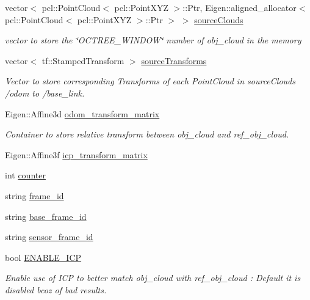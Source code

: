 \begin{DoxyCompactItemize}
vector$<$ pcl\+::\+Point\+Cloud$<$ pcl\+::\+Point\+X\+YZ $>$\+::Ptr, Eigen\+::aligned\+\_\+allocator$<$ pcl\+::\+Point\+Cloud$<$ pcl\+::\+Point\+X\+YZ $>$\+::Ptr $>$ $>$ \hyperlink{classdatmo_1_1cloud__segmentation_abcf359aaf4f17128e961473692d9c473}{source\+Clouds}
\begin{DoxyCompactList}\small\item\em vector to store the \char`\"{}\+O\+C\+T\+R\+E\+E\+\_\+\+W\+I\+N\+D\+O\+W\char`\"{} number of obj\+\_\+cloud in the memory \end{DoxyCompactList}\item 
vector$<$ tf\+::\+Stamped\+Transform $>$ \hyperlink{classdatmo_1_1cloud__segmentation_a24a81e37b2eff06482f65b09e39af9e4}{source\+Transforms}
\begin{DoxyCompactList}\small\item\em Vector to store corresponding Transforms of each Point\+Cloud in source\+Clouds /odom to /base\+\_\+link. \end{DoxyCompactList}\item 
Eigen\+::\+Affine3d \hyperlink{classdatmo_1_1cloud__segmentation_a9f47c2e7cba42121779e2772a052f58b}{odom\+\_\+transform\+\_\+matrix}
\begin{DoxyCompactList}\small\item\em Container to store relative transform between obj\+\_\+cloud and ref\+\_\+obj\+\_\+cloud. \end{DoxyCompactList}\item 
Eigen\+::\+Affine3f \hyperlink{classdatmo_1_1cloud__segmentation_ac7762960a72df80afdf8bedd59335ddc}{icp\+\_\+transform\+\_\+matrix}
\item 
int \hyperlink{classdatmo_1_1cloud__segmentation_a56499171fe846acfb2a73a5134261a91}{counter}
\item 
string \hyperlink{classdatmo_1_1cloud__segmentation_a16ce63fc6e22bab22c377d9049923119}{frame\+\_\+id}
\item 
string \hyperlink{classdatmo_1_1cloud__segmentation_a744619077c95172db4c19f45dcd9f30c}{base\+\_\+frame\+\_\+id}
\item 
string \hyperlink{classdatmo_1_1cloud__segmentation_a53785ef8494de0fd1efed824562f3368}{sensor\+\_\+frame\+\_\+id}
\item 
bool \hyperlink{classdatmo_1_1cloud__segmentation_a71c4d63aacea33f4c1b172e1ff723163}{E\+N\+A\+B\+L\+E\+\_\+\+I\+CP}
\begin{DoxyCompactList}\small\item\em Enable use of I\+CP to better match obj\+\_\+cloud with ref\+\_\+obj\+\_\+cloud \+: Default it is disabled bcoz of bad results. \end{DoxyCompactList}\item 

\end{DoxyCompactItemize}
